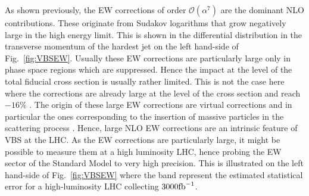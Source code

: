 As shown previously, the EW corrections of order $\mathcal{O}\left(\alpha^7\right)$ are the dominant NLO contributions.
These originate from Sudakov logarithms that grow negatively large in the high energy limit.
This is shown in the differential distribution in the transverse momentum of the hardest jet on the left hand-side of Fig.~\ref{fig:VBSEW}.
Usually these EW corrections are particularly large only in phase space regions which are suppressed.
Hence the impact at the level of the total fiducial cross section is usually rather limited.
This is not the case here where the corrections are already large at the level of the cross section and reach $-16\%$ \cite{Biedermann:2016yds}.
The origin of these large EW corrections are virtual corrections and in particular the ones corresponding to the insertion of massive particles in the scattering process \cite{Biedermann:2016yds}.
Hence, large NLO EW corrections are an intrinsic feature of VBS at the LHC.
As the EW corrections are particularly large, it might be possible to measure them at a high luminosity LHC, hence probing the EW sector of the Standard Model to very high precision.
This is illustrated on the left hand-side of Fig.~\ref{fig:VBSEW} where the band represent the estimated statistical error for a high-luminosity LHC collecting $3000{\rm fb}^{-1}$.

